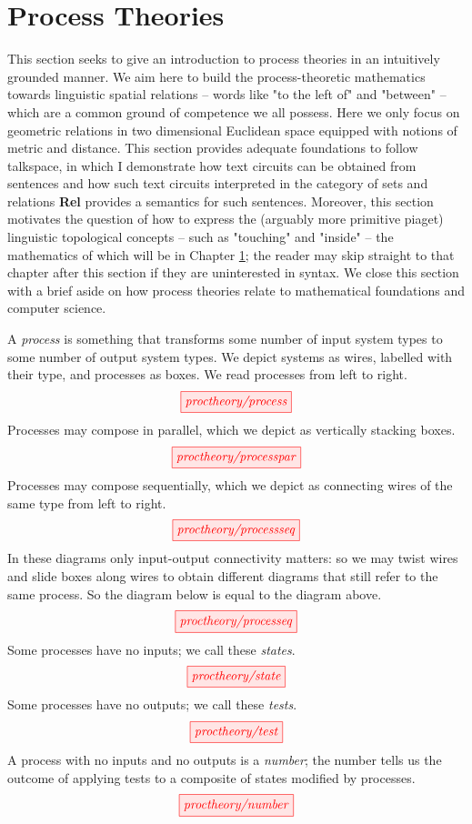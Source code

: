 \section{Process Theories}

This section seeks to give an introduction to process theories in an intuitively grounded manner. We aim here to build the process-theoretic mathematics towards linguistic spatial relations -- words like "to the left of" and "between" -- which are a common ground of competence we all possess. Here we only focus on geometric relations in two dimensional Euclidean space equipped with notions of metric and distance. This section provides adequate foundations to follow \citep{}talkspace, in which I demonstrate how text circuits can be obtained from sentences and how such text circuits interpreted in the category of sets and relations \textbf{Rel} provides a semantics for such sentences. Moreover, this section motivates the question of how to express the (arguably more primitive \citep{}piaget) linguistic topological concepts -- such as "touching" and "inside" -- the mathematics of which will be in Chapter \ref{}; the reader may skip straight to that chapter after this section if they are uninterested in syntax. We close this section with a brief aside on how process theories relate to mathematical foundations and computer science.

A \emph{process} is something that transforms some number of input system types to some number of output system types. We depict systems as wires, labelled with their type, and processes as boxes. We read processes from left to right.
\[\tikzfig{proctheory/process}\]
Processes may compose in parallel, which we depict as vertically stacking boxes.
\[\tikzfig{proctheory/processpar}\]
Processes may compose sequentially, which we depict as connecting wires of the same type from left to right.
\[\tikzfig{proctheory/processseq}\]
In these diagrams only input-output connectivity matters: so we may twist wires and slide boxes along wires to obtain different diagrams that still refer to the same process. So the diagram below is equal to the diagram above.
\[\tikzfig{proctheory/processeq}\]
Some processes have no inputs; we call these \emph{states}. 
\[\tikzfig{proctheory/state}\]
Some processes have no outputs; we call these \emph{tests}.
\[\tikzfig{proctheory/test}\]
A process with no inputs and no outputs is a \emph{number}; the number tells us the outcome of applying tests to a composite of states modified by processes.
\[\tikzfig{proctheory/number}\]

